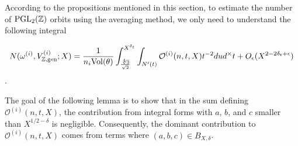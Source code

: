 \documentclass{article}
\def\Z{{\mathbb Z}}
\def\PGL{{\rm PGL}}
\def\gen{{\rm gen}}
\def\Vol{{\rm Vol}}
\def\Z{{\mathbb Z}}
\def \Bo{{\mathcal{O}^{(i)}(n,t,X)}}
\def \dw{{t^{-2}dud^\times t  }}
\begin{document}
According to the propositions mentioned in this section, to estimate the number of $\PGL_2(\mathbb{Z})$ orbits using the averaging method, we only need to understand the following integral

\begin{equation*}
N(\omega^{(i)},V_{\Z, \gen}^{(i)};X) = \frac{1}{n_i \Vol(\theta)} \int_{\frac{\sqrt[4]{3}}{\sqrt{2}}}^{X^{\delta_t}}\int_{N'(t)}  
   \Bo \dw + O_{\epsilon}(X^{2-2\delta_t+\epsilon})
\end{equation*}.

The goal of the following lemma is to show that in the sum defining $\Bo$, the contribution from integral forms with $a$, $b$, and $c$ smaller than $X^{1/2-\delta}$ is negligible. Consequently, the dominant contribution to $\Bo$ comes from terms where $(a,b,c)\in B_{X,\delta}$.
\end{document}
